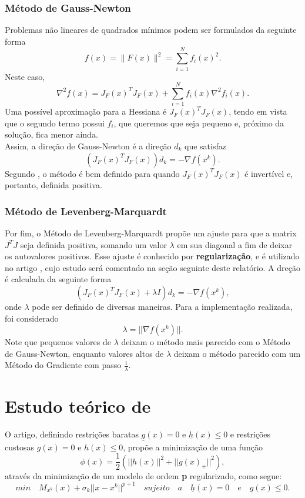 \documentclass[11pt]{article}
\begin{document}
\subsubsection*{Método de Gauss-Newton}
Problemas não lineares de quadrados mínimos podem ser formulados da seguinte forma 
$$f(x)=\|F(x)\|^2=\sum_{i=1}^N f_i(x)^2.$$
Neste caso, $$\nabla^2 f(x)= J_F(x)^T J_F(x)+\sum_{i=1}^N f_i(x) \nabla^2 f_i(x).$$
Uma possível aproximação para a Hessiana é $J_F(x)^T J_F(x)$, tendo em vista que o segundo termo possui $f_i$, que queremos que seja pequeno e, próximo da solução, fica menor ainda. \\


\noindent
Assim, a direção de Gauss-Newton é a direção $d_k$ que satisfaz $$(J_F(x)^T J_F(x)) d_k = - \nabla f(x^k).$$
Segundo \cite{artigoLevenberg}, o método é bem definido para quando $J_F(x)^T J_F(x)$ é invertível e, portanto, definida positiva. 

\subsubsection*{Método de Levenberg-Marquardt}
Por fim, o Método de Levenberg-Marquardt propõe um ajuste para que a matrix $J^TJ$ seja definida positiva, somando um valor $\lambda$ em sua diagonal a fim de deixar os autovalores positivos. Esse ajuste é conhecido por \textbf{regularização}, e é utilizado no artigo \cite{bmLS}, cujo estudo será comentado na seção seguinte deste relatório. A dreção é calculada da seguinte forma
$$(J_F(x)^T J_F(x) + \lambda I) d_k = - \nabla f(x^k),$$
onde $\lambda$ pode ser definido de diversas maneiras. Para a implementação realizada, foi considerado $$\lambda = ||\nabla f(x^k)||.$$ 
Note que pequenos valores de $\lambda$ deixam o método mais parecido com o Método de Gauss-Newton, enquanto valores altos de $\lambda$ deixam o método parecido com um Método do Gradiente com passo $\frac{1}{\lambda}$.

\section{Estudo teórico de \cite{bmLS}}
O artigo, definindo restrições baratas $\underline{g}(x) = 0$ e $\underline{h}(x) \leq 0$ e restrições custosas $g(x) = 0$ e $h(x) \leq 0$, propõe a minimização de uma função 
$$\phi (x) = \frac{1}{2}(||h(x)||^2 + ||g(x)_{+}||^2),$$
através da minimização de um modelo de ordem \textbf{p} regularizado, como segue:
$$min \quad M_{x^{k}}(x) + \sigma _{k}||x - x^{k}||^{p + 1} \quad sujeito\quad a \quad \underline{h}(x) = 0 \quad e \quad \underline{g}(x) \leq 0.$$
\end{document}
